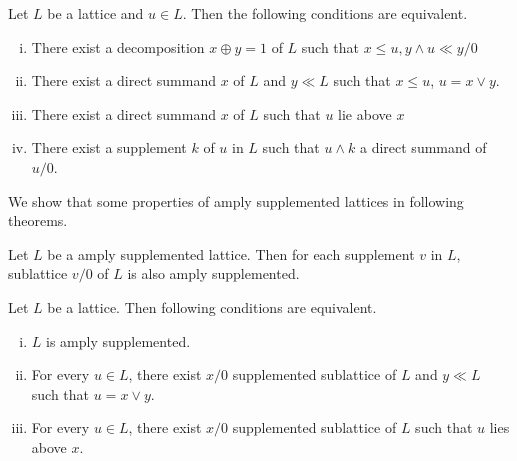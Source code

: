 \documentclass[handout]{beamer}
\begin{document}
\begin{frame}
    \begin{theorem} \label{4.2.8}
        Let $ L $ be a lattice and $ u \in L $. Then the following conditions are equivalent. 
        \begin{enumerate}[(i)]
            \item
                There exist a decomposition $ x \oplus y = 1 $ of $ L $ such that $ x \leq u, y \wedge u \ll y/0 $
            \item
                There exist a direct summand $ x $ of $ L $ and $ y \ll L $ such that $ x \leq u $, $ u = x \vee y $.
            \item
                There exist a direct summand $ x $ of $ L $ such that $ u $ lie above $ x $
            \item
                There exist a supplement $ k $ of $ u $ in $ L $ such that $ u \wedge k $ a direct summand of $ u/0 $. 
        \end{enumerate}
    \end{theorem}
\end{frame}


\begin{frame}
    We show that some properties of amply supplemented lattices in following theorems. 
    \pause
    \begin{lemma} \label{4.2.9}
        Let $ L $ be a amply supplemented lattice. Then for each supplement $ v $ in $ L $, sublattice $ v/0 $ of $ L $ is also amply supplemented.
    \end{lemma}
\end{frame}


\begin{frame}
    \begin{theorem} \label{4.2.10}
        Let $ L $ be a lattice. Then following conditions are equivalent.
        \begin{enumerate}[(i)]
            \item
                $ L $ is amply supplemented.
            \item
                For every $ u \in L $, there exist $ x/0 $ supplemented sublattice of $ L $ and $ y \ll L $ such that $ u = x \vee y $.
            \item
                For every $ u \in L $, there exist $ x/0 $ supplemented sublattice of $ L $ such that $ u $ lies above $ x $.
        \end{enumerate}
    \end{theorem}
\end{frame}
\end{document}
